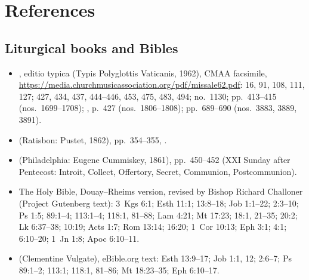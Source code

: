 \section*{References}
\label{sec:references}

{\footnotesize
\subsection*{Liturgical books and Bibles}
\begin{itemize}
\item {}, editio typica (Typis Polyglottis Vaticanis, 1962), CMAA facsimile, \url{https://media.churchmusicassociation.org/pdf/missale62.pdf}:  16, 91, 108, 111, 127;  427, 434, 437, 444--446, 453, 475, 483, 494;  no.~1130; pp.~413--415 (nos.~1699--1708); , p.~427 (nos.~1806--1808); pp.~689--690 (nos.~3883, 3889, 3891).
\item {} (Ratisbon: Pustet, 1862), pp.~354--355, .
\item {} (Philadelphia: Eugene Cummiskey, 1861), pp.~450--452 (XXI Sunday after Pentecost: Introit, Collect, Offertory, Secret, Communion, Postcommunion).
\item The Holy Bible, Douay--Rheims version, revised by Bishop Richard Challoner (Project Gutenberg text): 3~Kgs 6:1; Esth 11:1; 13:8--18; Job 1:1--22; 2:3--10; Ps 1:5; 89:1--4; 113:1--4; 118:1, 81--88; Lam 4:21; Mt 17:23; 18:1, 21--35; 20:2; Lk 6:37--38; 10:19; Acts 1:7; Rom 13:14; 16:20; 1~Cor 10:13; Eph 3:1; 4:1; 6:10--20; 1~Jn 1:8; Apoc 6:10--11.
\item {} (Clementine Vulgate), eBible.org text: Esth 13:9--17; Job 1:1, 12; 2:6--7; Ps 89:1--2; 113:1; 118:1, 81--86; Mt 18:23--35; Eph 6:10--17.
\end{itemize}

}
